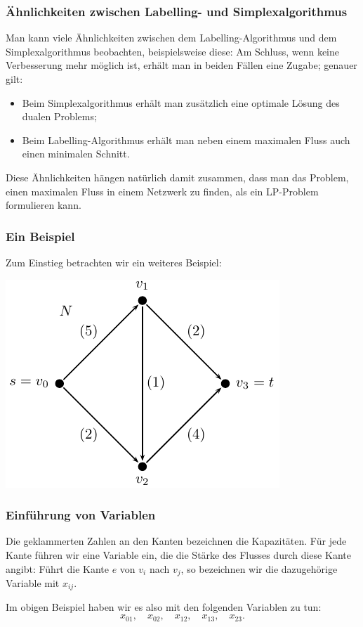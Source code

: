 \documentclass[smaller]{beamer}
\begin{document}
\begin{frame}
\frametitle{Ähnlichkeiten zwischen Labelling- und Simplexalgorithmus}
Man kann viele Ähnlichkeiten zwischen dem Labelling-Algorithmus und dem Simplexalgorithmus beobachten, beispielsweise diese: Am Schluss, wenn keine Verbesserung mehr möglich ist, erhält man in beiden Fällen eine \alert{Zugabe}; genauer gilt: 
\begin{itemize}
\item Beim \alert{Simplexalgorithmus} erhält man zusätzlich eine \alert{optimale Lösung des dualen Problems};
\item Beim \alert{Labelling-Algorithmus} erhält man neben einem maximalen Fluss auch einen \alert{minimalen Schnitt}.
\end{itemize}
Diese Ähnlichkeiten hängen natürlich damit zusammen, \alert{dass man das Problem, einen maximalen Fluss in einem Netzwerk zu finden, als ein LP-Problem formulieren kann}.
\end{frame}

\begin{frame}
\frametitle{Ein Beispiel}
Zum Einstieg betrachten wir ein weiteres Beispiel:

\begin{center}
 \includegraphics{fig63.pdf}
\end{center}

\end{frame}

\begin{frame}
\frametitle{Einführung von Variablen}
Die geklammerten Zahlen an den Kanten bezeichnen die Kapazitäten. \alert{Für jede Kante führen wir eine Variable ein, die die Stärke des Flusses durch diese Kante angibt}: Führt die Kante $e$ von $v_i$ nach $v_j$, so bezeichnen wir die dazugehörige Variable mit $x_{ij}$. \\ \vspace*{0.2cm}

Im obigen Beispiel haben wir es also mit den folgenden Variablen zu tun:
\[
x_{01},\quad
x_{02},\quad
x_{12},\quad
x_{13},\quad
x_{23}.
\]
\end{frame}
\end{document}
